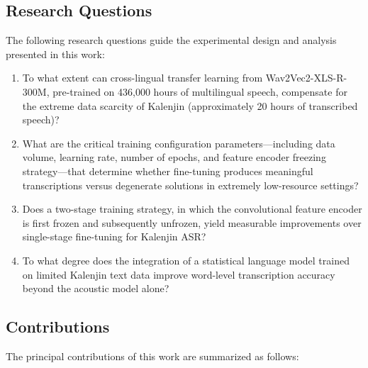 \documentclass[journal]{IEEEtran}
\begin{document}
\subsection{Research Questions}

The following research questions guide the experimental design and analysis presented in this work:

\begin{enumerate}[label=\textbf{RQ\arabic*.}]
    \item To what extent can cross-lingual transfer learning from Wav2Vec2-XLS-R-300M, pre-trained on 436,000 hours of multilingual speech, compensate for the extreme data scarcity of Kalenjin (approximately 20 hours of transcribed speech)?

    \item What are the critical training configuration parameters---including data volume, learning rate, number of epochs, and feature encoder freezing strategy---that determine whether fine-tuning produces meaningful transcriptions versus degenerate solutions in extremely low-resource settings?

    \item Does a two-stage training strategy, in which the convolutional feature encoder is first frozen and subsequently unfrozen, yield measurable improvements over single-stage fine-tuning for Kalenjin ASR?

    \item To what degree does the integration of a statistical language model trained on limited Kalenjin text data improve word-level transcription accuracy beyond the acoustic model alone?
\end{enumerate}

\subsection{Contributions}

The principal contributions of this work are summarized as follows:
\end{document}
